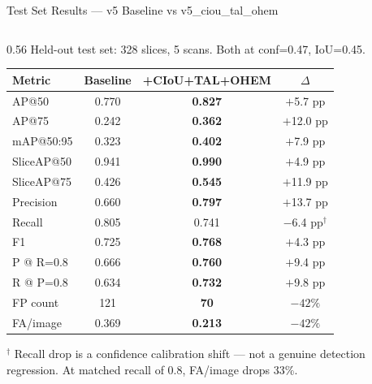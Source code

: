 \documentclass[aspectratio=169, 10pt]{beamer}
\begin{document}
\begin{frame}{Test Set Results — v5 Baseline vs v5\_ciou\_tal\_ohem}
  \begin{columns}[T]
    \begin{column}{0.56\textwidth}
      {\small Held-out test set: 328 slices, 5 scans. Both at conf=0.47, IoU=0.45.}

      \vspace{6pt}
      \begin{center}
      {\small
      \begin{tabular}{lccc}
        \toprule
        Metric & Baseline & \textbf{+CIoU+TAL+OHEM} & $\Delta$ \\
        \midrule
        AP@50         & 0.770 & \textbf{0.827} & \textcolor{good}{$+$5.7 pp} \\
        \rowcolor{rowhl}
        AP@75         & 0.242 & \textbf{0.362} & \textcolor{good}{$+$12.0 pp} \\
        mAP@50:95     & 0.323 & \textbf{0.402} & \textcolor{good}{$+$7.9 pp} \\
        \rowcolor{rowhl}
        SliceAP@50    & 0.941 & \textbf{0.990} & \textcolor{good}{$+$4.9 pp} \\
        SliceAP@75    & 0.426 & \textbf{0.545} & \textcolor{good}{$+$11.9 pp} \\
        \rowcolor{rowhl}
        Precision     & 0.660 & \textbf{0.797} & \textcolor{good}{$+$13.7 pp} \\
        Recall        & 0.805 & 0.741 & \textcolor{bad}{$-$6.4 pp}$^\dagger$ \\
        F1            & 0.725 & \textbf{0.768} & \textcolor{good}{$+$4.3 pp} \\
        \rowcolor{rowhl}
        P @ R=0.8     & 0.666 & \textbf{0.760} & \textcolor{good}{$+$9.4 pp} \\
        R @ P=0.8     & 0.634 & \textbf{0.732} & \textcolor{good}{$+$9.8 pp} \\
        \midrule
        FP count      & 121   & \textbf{70}    & \textcolor{good}{$-42\%$} \\
        FA/image      & 0.369 & \textbf{0.213} & \textcolor{good}{$-42\%$} \\
        \bottomrule
      \end{tabular}
      }
      \end{center}
      {\scriptsize $^\dagger$ Recall drop is a confidence calibration shift — not a genuine
      detection regression. At matched recall of 0.8, FA/image drops 33\%.}

\end{column}
\end{columns}
\end{frame}
\end{document}
